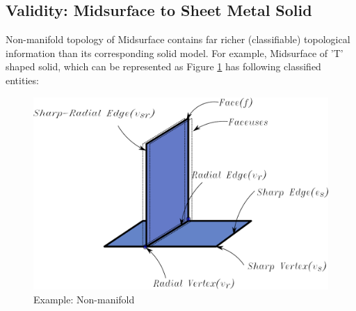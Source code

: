%
%

\subsection{Validity: Midsurface to Sheet Metal Solid}
Non-manifold topology of Midsurface contains far richer (classifiable) topological information than its corresponding solid model. For example, Midsurface of 'T' shaped solid, which can be represented as Figure \ref{fig_nonmanifold} has following classified entities:

\begin{figure}[htbp]
\includegraphics[width=0.7\linewidth]{../Common/images/NonManifoldT.pdf} 
\caption{Example: Non-manifold}
\label{fig_nonmanifold}
\end{figure}

